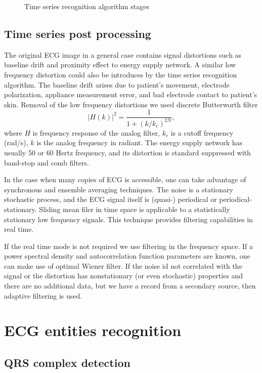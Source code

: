 \documentclass[runningheads]{AIIT}
\begin{document}
\begin{figure}[htb]
  \centering

  \caption{Time series recognition algorithm stages}
  \label{fig:leads-ex}
\end{figure}

\subsection{Time series post processing}
\label{sec:cleaning-artefacts}

The original ECG image in a general case contains signal distortions such as baseline drift and proximity effect to energy supply network.  A similar low frequency distortion could also be introduces by the time series recognition algorithm.  The baseline drift arises due to patient's movement, electrode polarization, appliance measurement error, and bad electrode contact to patient's skin.  Removal of the low frequency distortions we used discrete Butterworth filter
$$
|H(k)|^2=\frac{1}{1+(k/k_c)^{2N}},
$$
where $H$ is frequency response of the analog filter, $k_c$ is a cutoff frequency (rad/s), $k$ is the analog frequency in radiant.  The energy supply network has usually 50 or 60 Hertz frequency, and its distortion is standard suppressed with band-stop and comb filters.

In the case when many copies of ECG is accessible, one can take advantage of synchronous and ensemble averaging techniques.  The noise is a stationary stochastic process, and the ECG signal itself is (quasi-) periodical or periodical-stationary.  Sliding mean filer in time space is applicable to a statistically stationary low frequency signals.  This technique provides filtering capabilities in real time.

If the real time mode is not required we use filtering in the frequency space.  If a power spectral density and autocorrelation function parameters are known, one can make use of optimal Wiener filter.  If the noise id not correlated with the signal or the distortion has nonstationary (or even stochastic) properties and there are no additional data, but we have a record from a secondary source, then adaptive filtering is used.

\section{ECG entities recognition}
\label{sec:ecg-etit-recogn}

\subsection{QRS complex detection}
\label{sec:qrs-compl-detect}
\end{document}
